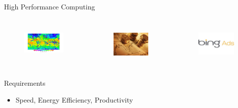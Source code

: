 \begin{frame}{High Performance Computing}
  \begin{columns}
    \begin{figure}[ht]
      \centering
      \includegraphics[scale=0.4, clip=true, trim=50 50 50 0]{figs/weather-forecasting.jpg}\\
    \end{figure}
    \begin{figure}[ht]
      \centering
      \includegraphics[scale=0.29, clip=true, trim=0 20 0 20]{figs/finance.jpg}\\
    \end{figure}
    \begin{figure}[ht]
      \centering
      \includegraphics[scale=0.25]{figs/ads.jpg}\\
    \end{figure}
  \end{columns}
  \vspace{0.5cm}

  \begin{beamerboxesrounded}{Requirements}
    \begin{itemize}
    \item Speed, Energy Efficiency, Productivity
    \end{itemize}
  \end{beamerboxesrounded}
  \vspace{0.5cm}


\end{frame}
